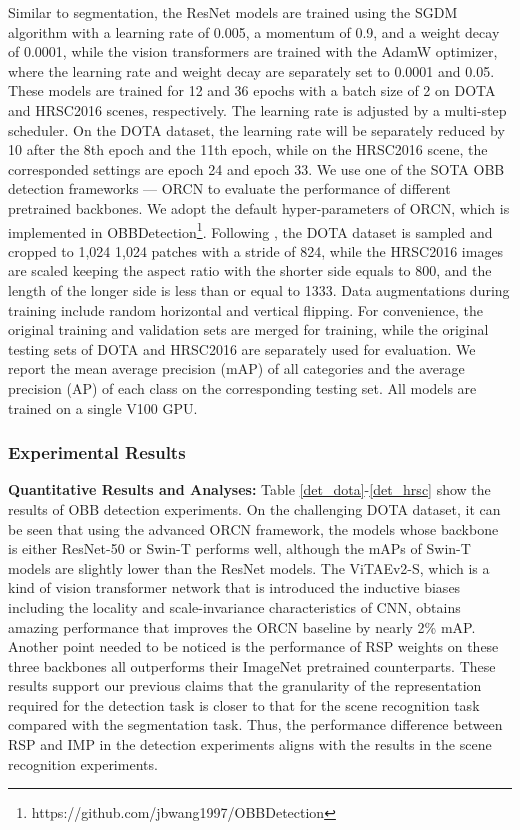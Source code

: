 \documentclass[10pt, journal,twoside]{IEEEtran}
\begin{document}
Similar to segmentation, the ResNet models are trained using the SGDM algorithm with a learning rate of 0.005, a momentum of 0.9, and a weight decay of 0.0001, while the vision transformers are trained with the AdamW optimizer, where the learning rate and weight decay are separately set to 0.0001 and 0.05. These models are trained for 12 and 36 epochs with a batch size of 2 on DOTA and HRSC2016 scenes, respectively. The learning rate is adjusted by a multi-step scheduler. On the DOTA dataset, the learning rate will be separately reduced by 10 after the 8th epoch and the 11th epoch, while on the HRSC2016 scene, the corresponded settings are epoch 24 and epoch 33. We use one of the SOTA OBB detection frameworks --- ORCN \cite{orcn} to evaluate the performance of different pretrained backbones. We adopt the default hyper-parameters of ORCN, which is implemented in OBBDetection\footnote{https://github.com/jbwang1997/OBBDetection}. Following \cite{orcn}, the DOTA dataset is sampled and cropped to 1,024  1,024 patches with a stride of 824, while the HRSC2016 images are scaled keeping the aspect ratio with the shorter side equals to 800, and the length of the longer side is less than or equal to 1333. Data augmentations during training include random horizontal and vertical flipping. For convenience, the original training and validation sets are merged for training, while the original testing sets of DOTA and HRSC2016 are separately used for evaluation. We report the mean average precision (mAP) of all categories and the average precision (AP) of each class on the corresponding testing set. All models are trained on a single V100 GPU.

\subsubsection{Experimental Results}

\textbf{Quantitative Results and Analyses:} Table \ref{det_dota}-\ref{det_hrsc} show the results of OBB detection experiments. On the challenging DOTA dataset, it can be seen that using the advanced ORCN framework, the models whose backbone is either ResNet-50 or Swin-T performs well, although the mAPs of Swin-T models are slightly lower than the ResNet models. The ViTAEv2-S, which is a kind of vision transformer network that is introduced the inductive biases including the locality and scale-invariance characteristics of CNN, obtains amazing performance that improves the ORCN baseline by nearly 2\% mAP. Another point needed to be noticed is the performance of RSP weights on these three backbones all outperforms their ImageNet pretrained counterparts. These results support our previous claims that the granularity of the representation required for the detection task is closer to that for the scene recognition task compared with the segmentation task. Thus, the performance difference between RSP and IMP in the detection experiments aligns with the results in the scene recognition experiments. 
\end{document}
